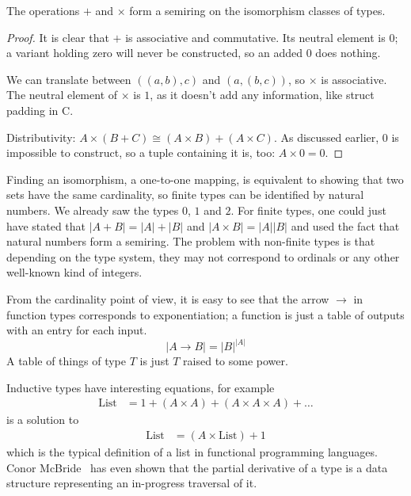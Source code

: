 \documentclass[english, 12pt, a4paper, sci, a-1b, online]{aaltothesis}
\begin{document}
\begin{theorem}
  The operations $+$ and $\times$ form a semiring on the isomorphism classes of types.
\end{theorem}

\begin{proof}
  It is clear that $+$ is associative and commutative. Its neutral element is $0$; a variant holding zero will never be constructed, so an added $0$ does nothing.

  We can translate between $((a, b), c)$ and $(a, (b, c))$, so $\times$ is associative. The neutral element of $\times$ is $1$, as it doesn't add any information, like struct padding in C.

  Distributivity: $A \times (B + C) \cong (A \times B) + (A \times C)$. As discussed earlier, $0$ is impossible to construct, so a tuple containing it is, too: $A \times 0 = 0$.
\end{proof}

Finding an isomorphism, a one-to-one mapping, is equivalent to showing that two sets have the same cardinality, so finite types can be identified by natural numbers. We already saw the types $0$, $1$ and $2$. For finite types, one could just have stated that $|A + B| = |A| + |B|$ and $|A \times B| = |A||B|$ and used the fact that natural numbers form a semiring. The problem with non-finite types is that depending on the type system, they may not correspond to ordinals or any other well-known kind of integers.

From the cardinality point of view, it is easy to see that the arrow $\to$ in function types corresponds to exponentiation; a function is just a table of outputs with an entry for each input.
\begin{equation*}
  |A \to B| = |B|^{|A|}
\end{equation*}
A table of things of type $T$ is just $T$ raised to some power.

Inductive types have interesting equations, for example
\begin{align*}
  \text{List} &= 1 + (A \times A) + (A \times A \times A) + \ldots
\end{align*}
is a solution to
\begin{align*}
  \text{List} &= (A \times \text{List}) + 1
\end{align*}
which is the typical definition of a list in functional programming languages. Conor McBride~\cite{typeDerivative} has even shown that the partial derivative of a type is a data structure representing an in-progress traversal of it.
\end{document}
